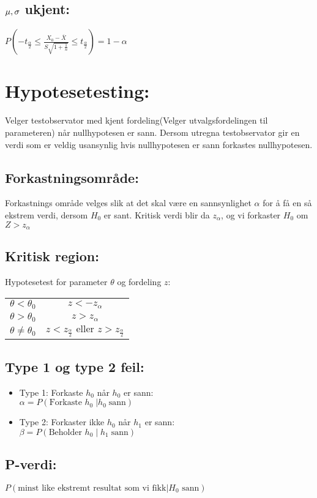 \documentclass[12pt,a4paper,twocolumn,twoside]{article}
\begin{document}
\subsection*{$\bold{\mu,\sigma}$ ukjent:}
$P\left(-t_{\frac{\alpha}{2}}\leq\frac{X_0-\overline{X}}{S\sqrt{1+\frac{1}{n}}}\leq t_{\frac{\alpha}{2}}\right) = 1-\alpha$

%
%
\section*{Hypotesetesting:}
Velger testobservator med kjent fordeling(Velger utvalgsfordelingen til parameteren) når nullhypotesen er sann.
Dersom utregna testobservator gir en verdi som er veldig usansynlig hvis nullhypotesen er sann forkastes nullhypotesen.
\subsection*{Forkastningsområde:}
Forkastnings område velges slik at det skal være en sannsynlighet $\alpha$ for å få en så ekstrem verdi, dersom $H_0$ er sant.
Kritisk verdi blir da $z_\alpha$, og vi forkaster $H_0$ om $Z>z_\alpha$
\subsection*{Kritisk region:}
Hypotesetest for parameter $\theta$ og fordeling $z$:\\  
\begin{tabular}{|c|c|}
    $\theta<\theta_0$ & $z<-z_\alpha$ \\
    $\theta>\theta_0$ & $z>z_\alpha$ \\
    $\theta\neq\theta_0$ & $z<z_{\frac{\alpha}{2}} \text{ eller } z>z_{\frac{\alpha}{2}}$
\end{tabular}
\subsection*{Type 1 og type 2 feil:}
\begin{itemize}[topsep=0pt,itemsep=0pt, partopsep=0pt]
    \item Type 1: Forkaste $h_0$ når $h_0$ er sann:\\$\alpha = P(\text{Forkaste }h_0\;|h_0\;\text{sann})$
    \item Type 2: Forkaster ikke $h_0$ når $h_1$ er sann:\\$\beta = P(\text{Beholder }h_0\;|\;h_1\;\text{sann})$
\end{itemize}
\subsection*{P-verdi:}
$P(\text{minst like ekstremt resultat som vi fikk} | H_0 \text{ sann})$
\end{document}
